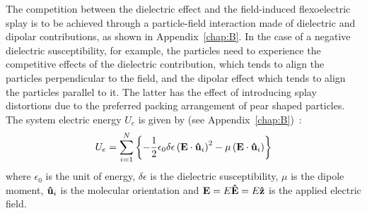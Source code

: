 The competition between the dielectric effect and the field-induced flexoelectric splay 
is to be achieved through a particle-field interaction made of dielectric and dipolar 
contributions, as shown in Appendix~\ref{chap:B}. 
In the case of a negative dielectric susceptibility, for example, the particles 
need to experience the competitive effects of the dielectric contribution, which tends to align 
the particles  perpendicular to the field, and the dipolar effect which tends to align 
the particles parallel  to it. The latter has the effect of introducing splay distortions 
due to the preferred packing arrangement of pear shaped particles.\\

The system electric energy $U_e$  is given by (see Appendix~\ref{chap:B})~:
%
\begin{equation}
	U_e = \sum_{i=1}^{N}\left\{ 
	-\frac{1}{2}\epsilon_0\delta\epsilon\left( \mathbf{E} \cdot \mathbf{\hat{u} }_i \right)^2 
	- \mu \left( \mathbf{E} \cdot \mathbf{\hat{u} }_i \right)
	\right\}
\end{equation}
%
where $\epsilon_0$ is the unit of energy, $\delta\epsilon$ is the dielectric susceptibility,
$\mu$ is the dipole moment, $\mathbf{\hat{u} }_i$ is the molecular orientation and $\mathbf{E} = E\mathbf{\hat{E} }=
E\mathbf{\hat{z} }$ is
the applied electric field.





